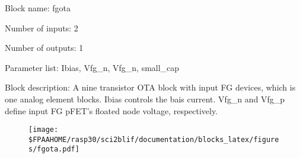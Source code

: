 \pagebreak

Block name: fgota

Number of inputs: 2

Number of outputs: 1

Parameter list: Ibias, Vfg\_n, Vfg\_n, small\_cap

Block description: 
A nine transistor OTA block with input FG devices, which is one analog element blocks. Ibias controls the bais current. Vfg\_n and Vfg\_p define input FG pFET's floated node voltage, respectively.

\begin{figure}[H]  %
\texttt{[image: \$FPAAHOME/rasp30/sci2blif/documentation/blocks\_latex/figures/fgota.pdf]}
\end{figure}

